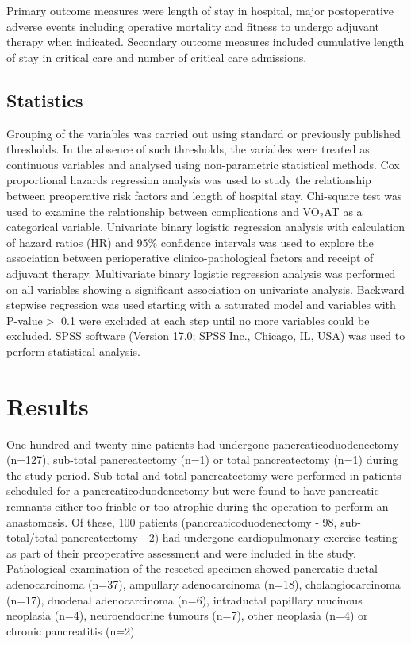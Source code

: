 Primary outcome measures were length of stay in hospital, major postoperative adverse events including operative mortality and fitness to undergo adjuvant therapy when indicated. 
Secondary outcome measures included cumulative length of stay in critical care and number of critical care admissions.

\subsection{Statistics}
Grouping of the variables was carried out using standard or previously published thresholds. 
In the absence of such thresholds, the variables were treated as continuous variables and analysed using non-parametric statistical methods. 
Cox proportional hazards regression analysis was used to study the relationship between preoperative risk factors and length of hospital stay. 
Chi-square test was used to examine the relationship between complications and VO$_2$AT as a categorical variable. 
Univariate binary logistic regression analysis with calculation of hazard ratios (HR) and 95\% confidence intervals was used to explore the association between perioperative clinico-pathological factors and receipt of adjuvant therapy. 
Multivariate binary logistic regression analysis was performed on all variables showing a significant association on univariate analysis. 
Backward stepwise regression was used starting with a saturated model and variables with P-value$>$  0.1 were excluded at each step until no more variables could be excluded. 
SPSS software (Version 17.0; SPSS Inc., Chicago, IL, USA) was used to perform statistical analysis.

\clearpage

\section{Results}
One hundred and twenty-nine patients had undergone pancreaticoduodenectomy (n=127), sub-total pancreatectomy (n=1) or total pancreatectomy (n=1) during the study period. 
Sub-total and total pancreatectomy were performed in patients scheduled for a pancreaticoduodenectomy but were found to have pancreatic remnants either too friable or too atrophic during the operation to perform an anastomosis. 
Of these, 100 patients (pancreaticoduodenectomy - 98, sub-total/total pancreatectomy - 2) had undergone cardiopulmonary exercise testing as part of their preoperative assessment and were included in the study. 
Pathological examination of the resected specimen showed pancreatic ductal adenocarcinoma (n=37), ampullary adenocarcinoma (n=18), cholangiocarcinoma (n=17), duodenal adenocarcinoma (n=6), intraductal papillary mucinous neoplasia (n=4), neuroendocrine tumours (n=7), other neoplasia (n=4) or chronic pancreatitis (n=2).

